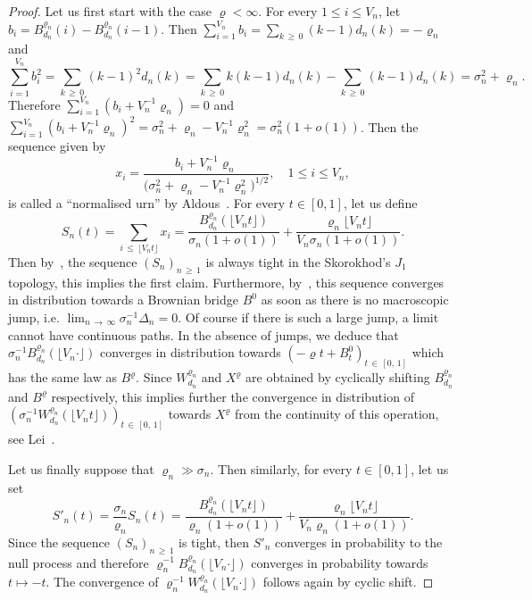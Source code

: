 \documentclass[10pt]{amsart}
\theoremstyle{definition}\newtheorem{defi}[theo]{Definition}\newtheorem{rema}[theo]{Remark}\newtheorem{exam}[theo]{Example}\newtheorem{exem}[theo]{Example}\newtheorem{nota}[theo]{Notation}
\newcommand{\1}{\ensembles{1}}
\renewcommand{\le}{\leqslant}
\renewcommand{\ge}{\geqslant}
\newcommand{\Wfn}{W_{d_n}^{\varrho_n}}
\newcommand{\Bfn}{B_{d_n}^{\varrho_n}}
\newcommand{\vertices}{V}
\providecommand{\?}{}
\begin{document}
\begin{proof}
Let us first start with the case $\varrho < \infty$. For every $1 \le i \le \vertices_n$, let $b_i = \Bfn(i) - \Bfn(i-1)$. Then $\sum_{i = 1}^{\vertices_n} b_i = \sum_{k\,\ge\, 0} (k - 1) d_n(k) = -\varrho_n$ and
\[
\sum_{i = 1}^{\vertices_n} b_i^2 = \sum_{k \,\ge\,0} (k - 1)^2 d_n(k) = \sum_{k\,\ge\,0} k (k - 1) d_n(k) - \sum_{k\,\ge\,0} (k - 1) d_n(k) = \sigma_n^2 + \varrho_n.
\]
Therefore $\sum_{i = 1}^{\vertices_n} (b_i + \vertices_n^{-1} \varrho_n) = 0$ and $\sum_{i = 1}^{\vertices_n} (b_i + \vertices_n^{-1} \varrho_n)^2 = \sigma_n^2 + \varrho_n - \vertices_n^{-1} \varrho_n^2 = \sigma_n^2 (1 + o(1))$. Then the sequence given by
\[
x_i = \frac{b_i + \vertices_n^{-1} \varrho_n}{\big(\sigma_n^2 + \varrho_n - \vertices_n^{-1} \varrho_n^2\big)^{1/2}},
\quad 1 \le i \le \vertices_n,
\]
is called a ``normalised urn'' by Aldous~\cite[Chapter~20]{Ald85}. For every $t \in [0,1]$, let us define
\[
S_n(t) = \sum_{i\,\le\,\lfloor \vertices_n t \rfloor} x_i =
\frac{\Bfn\left(\lfloor \vertices_n t \rfloor\right)}{\sigma_n (1 + o(1))} + \frac{\varrho_n \lfloor \vertices_n t \rfloor}{\vertices_n \sigma_n (1 + o(1))}.
\]
Then by~\cite[Proposition~20.3]{Ald85}, the sequence $(S_n)_{n\,\ge\,1}$ is always tight in the Skorokhod's $J_1$ topology, this implies the first claim. Furthermore, by~\cite[Theorem~20.7]{Ald85}, this sequence converges in distribution towards a Brownian bridge $B^0$ as soon as there is no macroscopic jump, i.e. $\lim_{n\,\to\,\infty} \sigma_n^{-1} \Delta_n = 0$. Of course if there is such a large jump, a limit cannot have continuous paths. In the absence of jumps, we deduce that $\sigma_n^{-1} \Bfn(\lfloor \vertices_n \cdot \rfloor)$ converges in distribution towards $(-\varrho t + B^0_t)_{t\,\in\,[0,\,1]}$ which has the same law as $B^\varrho$. Since $\Wfn$ and $X^\varrho$ are obtained by cyclically shifting $\Bfn$ and $B^\varrho$ respectively, this implies further the convergence in distribution of $(\sigma_n^{-1} \Wfn(\lfloor \vertices_n t \rfloor))_{t\,\in\,[0,\,1]}$ towards $X^\varrho$ from the continuity of this operation, see Lei~\cite[Section~4]{Lei19}.


Let us finally suppose that $\varrho_n \gg \sigma_n$. Then similarly, for every $t \in [0,1]$, let us set
\[
S'_n(t) = \frac{\sigma_n}{\varrho_n} S_n(t) = \frac{\Bfn\left(\lfloor \vertices_n t \rfloor\right)}{\varrho_n (1 + o(1))} + \frac{\varrho_n \lfloor \vertices_n t \rfloor}{\vertices_n \varrho_n (1 + o(1))}.
\]
Since the sequence $(S_n)_{n\,\ge\,1}$ is tight, then $S'_n$ converges in probability to the null process and therefore $\varrho_n^{-1} \Bfn(\lfloor \vertices_n \cdot \rfloor)$ converges in probability towards $t \mapsto -t$. The convergence of $\varrho_n^{-1} \Wfn(\lfloor \vertices_n \cdot \rfloor)$ follows again by cyclic shift.
\end{proof}
\end{document}

